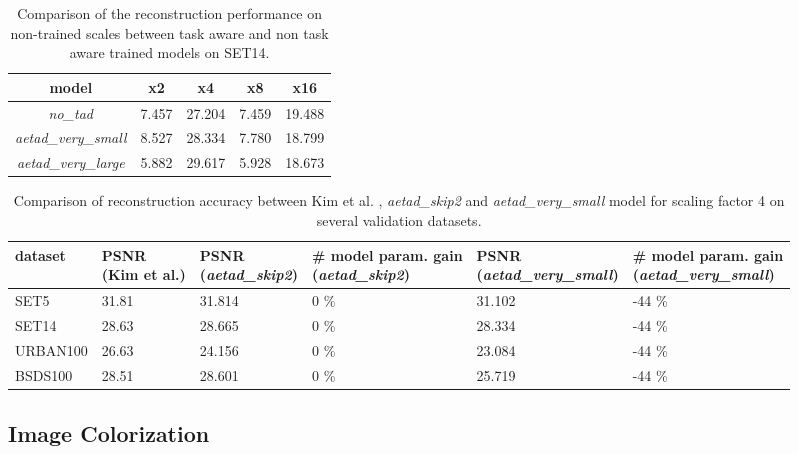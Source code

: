\begin{table}[!htbp]
	\begin{center}
	\begin{tabular}{c|c|c|c|c}
	model & x2 & x4 & x8 & x16 \\
	\hline
  \textit{no\_tad} & 7.457 & 27.204 & 7.459 & 19.488 \\
	\textit{aetad\_very\_small} & 8.527 & 28.334 & 7.780 & 18.799 \\
	\textit{aetad\_very\_large} & 5.882 & 29.617 & 5.928 & 18.673 \\
	\end{tabular}
	\caption{Comparison of the reconstruction performance on non-trained scales
	between task aware and non task aware trained models on SET14.}
	\label{table:sisrotherscales}
	\end{center}
\end{table}


\begin{table}[!htbp]
	\begin{center}
	\footnotesize
	\begin{tabular}{p{2cm}|p{2cm}|p{2cm}|p{3cm}|p{3cm}|p{3cm}}
	dataset & \pbox{2cm}{PSNR \\(Kim et al.)}
	& \pbox{2cm}{PSNR \\ (\textit{aetad\_skip2})}
	& \pbox{3cm}{\# model param. gain \\ (\textit{aetad\_skip2})}
	& \pbox{3cm}{PSNR \\ (\textit{aetad\_very\_small})}
	& \pbox{3cm}{\# model param. gain \\ (\textit{aetad\_very\_small})} \\
	\hline
  SET5 & 31.81 & 31.814 & 0 \% & 31.102 & -44 \% \\
	SET14 & 28.63 & 28.665 & 0 \% & 28.334 & -44 \% \\
	URBAN100 & 26.63 & 24.156 & 0 \% & 23.084 & -44 \% \\
	BSDS100 & 28.51 & 28.601 & 0 \% & 25.719 & -44 \% \\
	\end{tabular}
	\caption{Comparison of reconstruction accuracy between Kim et al. \cite{TAID},
	\textit{aetad\_skip2} and \textit{aetad\_very\_small}
	model for scaling factor 4 on several validation datasets. }
	\label{table:sisperformance}
	\normalsize
	\end{center}
\end{table}

\subsection{Image Colorization}
\label{sec:Experiments_IC}


